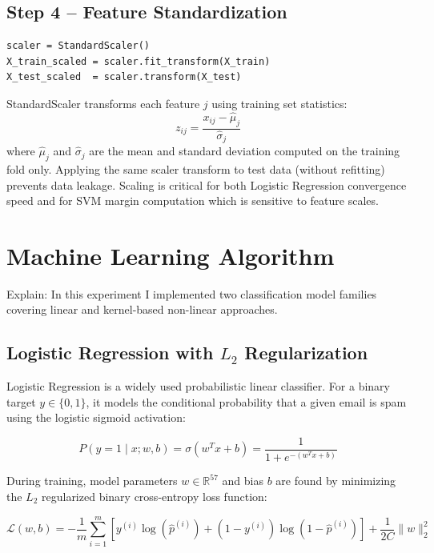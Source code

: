 \documentclass[12pt,a4paper]{article}
\begin{document}
\subsection*{Step 4 -- Feature Standardization}
\begin{lstlisting}
scaler = StandardScaler()
X_train_scaled = scaler.fit_transform(X_train)
X_test_scaled  = scaler.transform(X_test)
\end{lstlisting}
StandardScaler transforms each feature $j$ using training set statistics:
\begin{equation}
z_{ij} = \frac{x_{ij} - \hat{\mu}_j}{\hat{\sigma}_j}
\end{equation}
where $\hat{\mu}_j$ and $\hat{\sigma}_j$ are the mean and standard deviation computed on the training fold only. Applying the same scaler transform to test data (without refitting) prevents data leakage. Scaling is critical for both Logistic Regression convergence speed and for SVM margin computation which is sensitive to feature scales.

\section{Machine Learning Algorithm}

Explain:
In this experiment I implemented two classification model families covering linear and kernel-based non-linear approaches.

\subsection{Logistic Regression with $L_2$ Regularization}

Logistic Regression is a widely used probabilistic linear classifier. For a binary target $y \in \{0, 1\}$, it models the conditional probability that a given email is spam using the logistic sigmoid activation:

\begin{equation}
P(y=1 \mid x; w, b) = \sigma(w^T x + b) = \frac{1}{1 + e^{-(w^T x + b)}}
\end{equation}

During training, model parameters $w \in \mathbb{R}^{57}$ and bias $b$ are found by minimizing the $L_2$ regularized binary cross-entropy loss function:

\begin{equation}
\mathcal{L}(w, b) = -\frac{1}{m} \sum_{i=1}^{m} \left[ y^{(i)} \log(\hat{p}^{(i)}) + (1 - y^{(i)}) \log(1 - \hat{p}^{(i)}) \right] + \frac{1}{2C} \| w \|_2^2
\end{equation}
\end{document}
